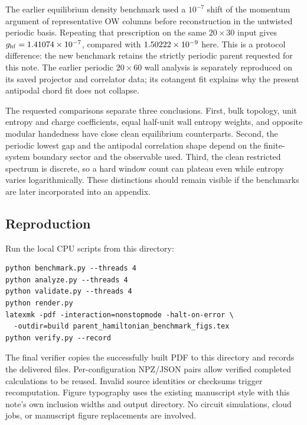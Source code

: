 \documentclass[aps,prb,onecolumn,nofootinbib,superscriptaddress]{revtex4-2}
\begin{document}
The earlier equilibrium density benchmark used a $10^{-7}$ shift of the momentum
argument of representative OW columns before reconstruction in the untwisted
periodic basis. Repeating that prescription on the same $20\times30$ input gives
$g_{\mathrm{hf}}=1.41074\times10^{-7}$, compared with $1.50222\times10^{-9}$ here. This is a
protocol difference: the new benchmark retains the strictly periodic parent
requested for this note. The earlier periodic $20\times60$ wall analysis is
separately reproduced on its saved projector and correlator data; its cotangent
fit explains why the present antipodal chord fit does not collapse.

The requested comparisons separate three conclusions. First, bulk topology,
unit entropy and charge coefficients, equal half-unit wall entropy weights, and
opposite modular handedness have close clean equilibrium counterparts. Second,
the periodic lowest gap and the antipodal correlation shape depend on the
finite-system boundary sector and the observable used. Third, the clean
restricted spectrum is discrete, so a hard window count can plateau even while
entropy varies logarithmically. These distinctions should remain visible if the
benchmarks are later incorporated into an appendix.

\subsection{Reproduction}
Run the local CPU scripts from this directory:
\begin{verbatim}
python benchmark.py --threads 4
python analyze.py --threads 4
python validate.py --threads 4
python render.py
latexmk -pdf -interaction=nonstopmode -halt-on-error \
  -outdir=build parent_hamiltonian_benchmark_figs.tex
python verify.py --record
\end{verbatim}
The final verifier copies the successfully built PDF to this directory and records
the delivered files. Per-configuration NPZ/JSON pairs allow verified completed
calculations to be reused. Invalid source identities or checksums trigger
recomputation. Figure typography uses the existing manuscript style with this
note's own inclusion widths and output directory. No circuit simulations, cloud
jobs, or manuscript figure replacements are involved.
\end{document}
